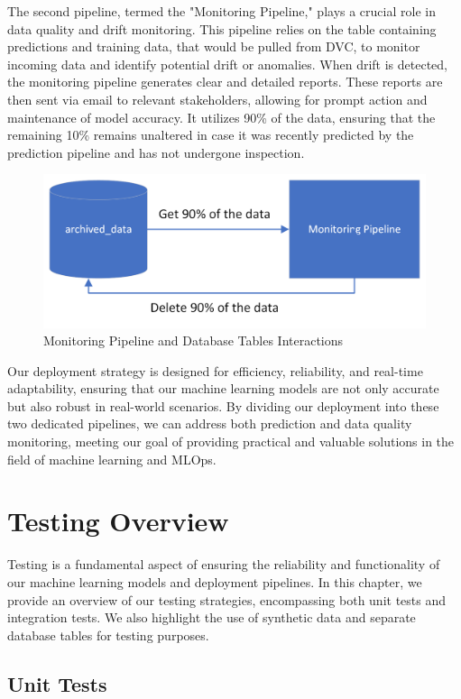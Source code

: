 \documentclass{report}
\begin{document}
The second pipeline, termed the "Monitoring Pipeline," plays a crucial role in data quality and drift monitoring. This pipeline relies on the table containing predictions and training data, that would be pulled from DVC, to monitor incoming data and identify potential drift or anomalies. When drift is detected, the monitoring pipeline generates clear and detailed reports. These reports are then sent via email to relevant stakeholders, allowing for prompt action and maintenance of model accuracy. It utilizes 90\% of the data, ensuring that the remaining 10\% remains unaltered in case it was recently predicted by the prediction pipeline and has not undergone inspection.

\begin{figure}[H]
    \centering
    \includegraphics[width=0.7\linewidth]{monitoring_pipeline.png}
    \caption{Monitoring Pipeline and Database Tables Interactions}
    \label{fig:monitoring_pipeline}
\end{figure}

Our deployment strategy is designed for efficiency, reliability, and real-time adaptability, ensuring that our machine learning models are not only accurate but also robust in real-world scenarios. By dividing our deployment into these two dedicated pipelines, we can address both prediction and data quality monitoring, meeting our goal of providing practical and valuable solutions in the field of machine learning and MLOps.


\chapter{Testing Overview}

Testing is a fundamental aspect of ensuring the reliability and functionality of our machine learning models and deployment pipelines. In this chapter, we provide an overview of our testing strategies, encompassing both unit tests and integration tests. We also highlight the use of synthetic data and separate database tables for testing purposes.

\section{Unit Tests}
\end{document}
